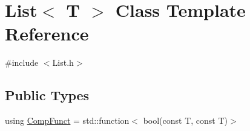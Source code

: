 \hypertarget{class_list}{\section{List$<$ T $>$ Class Template Reference}
\label{class_list}
}


{\ttfamily \#include $<$List.\-h$>$}

\subsection*{Public Types}
\begin{DoxyCompactItemize}
\item 
using \hyperlink{class_list_ae43380038701ec3a2fbecaf31f37dd19}{Comp\-Funct} = std\-::function$<$ bool(const T, const T)$>$
\end{DoxyCompactItemize}
